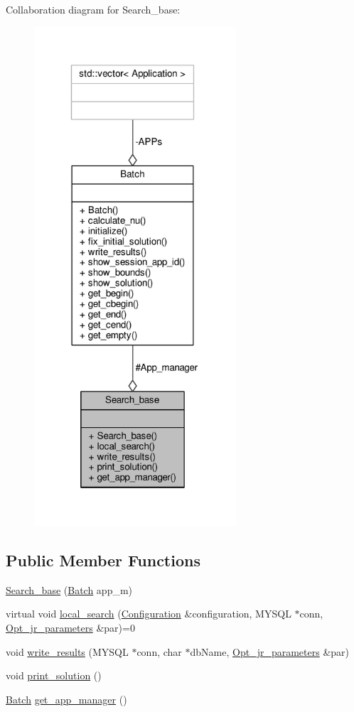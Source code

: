 Collaboration diagram for Search\-\_\-base\-:
\nopagebreak
\begin{figure}[H]
\begin{center}
\leavevmode
\includegraphics[width=213pt]{classSearch__base__coll__graph}
\end{center}
\end{figure}
\subsection*{Public Member Functions}
\begin{DoxyCompactItemize}
\item 
\hyperlink{classSearch__base_a222697de87f38891f9018defe1988dc4}{Search\-\_\-base} (\hyperlink{classBatch}{Batch} app\-\_\-m)
\item 
virtual void \hyperlink{classSearch__base_ab3730b1118efbe97065f1ea9715a90dc}{local\-\_\-search} (\hyperlink{classConfiguration}{Configuration} \&configuration, M\-Y\-S\-Q\-L $\ast$conn, \hyperlink{classOpt__jr__parameters}{Opt\-\_\-jr\-\_\-parameters} \&par)=0
\item 
void \hyperlink{classSearch__base_a43c7b22f332c3be3ed2f6da9e2d6d3a5}{write\-\_\-results} (M\-Y\-S\-Q\-L $\ast$conn, char $\ast$db\-Name, \hyperlink{classOpt__jr__parameters}{Opt\-\_\-jr\-\_\-parameters} \&par)
\item 
void \hyperlink{classSearch__base_a6380bc5489f95cf722fa7cc329dc9f9d}{print\-\_\-solution} ()
\item 
\hyperlink{classBatch}{Batch} \hyperlink{classSearch__base_a10a67e4278d8281e4db740924a2bd658}{get\-\_\-app\-\_\-manager} ()
\end{DoxyCompactItemize}
